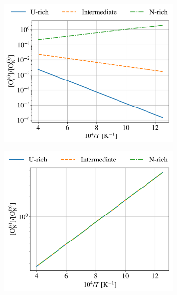 \documentclass[preprint,12pt,sort&compress]{elsarticle}
\newcommand{\?}{\stackrel{?}{=}}
\begin{document}
\begin{figure}[h!]
\centering
\begin{subfigure}{0.48\textwidth}
    \includegraphics[width=\textwidth]{Ois_ONb.png}
    \caption{}
    \label{Fig:Ois_ONb}
\end{subfigure}
\hfill
\begin{subfigure}{0.48\textwidth}
    \includegraphics[width=\textwidth]{ONs_ONb.png}
    \caption{}
    \label{Fig:ONs_ONb}
\end{subfigure}
\hfill
\begin{subfigure}{0.48\textwidth}

\end{subfigure}
\end{figure}
\end{document}
